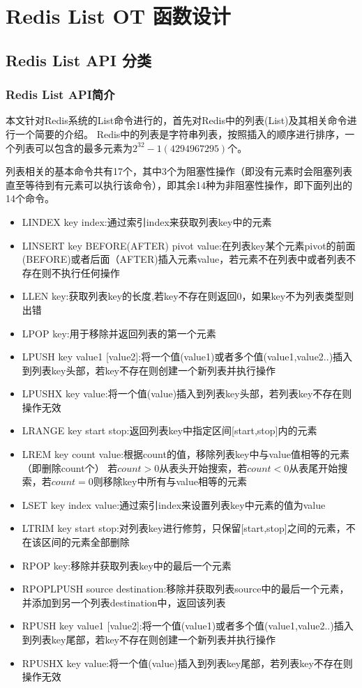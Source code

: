 \chapter{Redis List OT 函数设计}
\label{chapter:design}
\section{Redis List API 分类}
\subsection{Redis List API简介}
\par 本文针对Redis系统的List命令进行的，首先对Redis中的列表(List)及其相关命令进行一个简要的介绍。
Redis中的列表是字符串列表，按照插入的顺序进行排序，一个列表可以包含的最多元素为$2^{32}-1(4294967295)$个。

\par 列表相关的基本命令共有17个，其中3个为阻塞性操作（即没有元素时会阻塞列表直至等待到有元素可以执行该命令），即其余14种为非阻塞性操作，即下面列出的14个命令。\\

\begin{itemize}
\item LINDEX  key index:通过索引index来获取列表key中的元素
\item LINSERT key BEFORE(AFTER) pivot value:在列表key某个元素pivot的前面(BEFORE)或者后面（AFTER)插入元素value，若元素不在列表中或者列表不存在则不执行任何操作
\item LLEN key:获取列表key的长度,若key不存在则返回0，如果key不为列表类型则出错
\item LPOP key:用于移除并返回列表的第一个元素
\item LPUSH key value1 [value2]:将一个值(value1)或者多个值(value1,value2..)插入到列表key头部，若key不存在则创建一个新列表并执行操作
\item LPUSHX key value:将一个值(value)插入到列表key头部，若列表key不存在则操作无效
\item LRANGE key start stop:返回列表key中指定区间[start,stop]内的元素
\item LREM key count value:根据count的值，移除列表key中与value值相等的元素（即删除count个）
若$count > 0$从表头开始搜索，若$count < 0$从表尾开始搜索，若$count = 0$则移除key中所有与value相等的元素
\item LSET key index value:通过索引index来设置列表key中元素的值为value
\item LTRIM key start stop:对列表key进行修剪，只保留[start,stop]之间的元素，不在该区间的元素全部删除
\item RPOP key:移除并获取列表key中的最后一个元素
\item RPOPLPUSH source destination:移除并获取列表source中的最后一个元素，并添加到另一个列表destination中，返回该列表
\item RPUSH key value1 [value2]:将一个值(value1)或者多个值(value1,value2..)插入到列表key尾部，若key不存在则创建一个新列表并执行操作
\item RPUSHX key value:将一个值(value)插入到列表key尾部，若列表key不存在则操作无效
\end{itemize}

